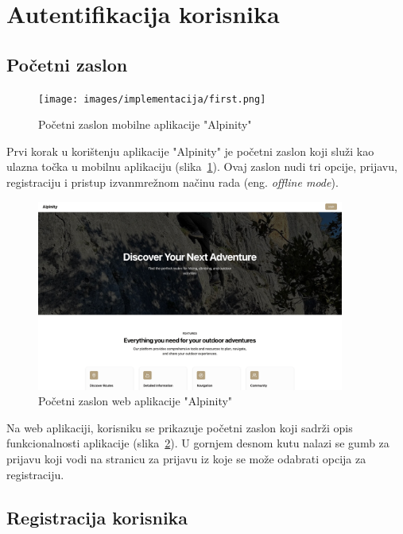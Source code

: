 \section{Autentifikacija korisnika}

\subsection{Početni zaslon}

\begin{figure}[H]
  \centering
  \texttt{[image: images/implementacija/first.png]}
  \caption{Početni zaslon mobilne aplikacije "Alpinity"}
  \label{fig:prvi_zaslon}
\end{figure}

Prvi korak u korištenju aplikacije "Alpinity" je početni zaslon koji služi kao ulazna točka u mobilnu aplikaciju (slika~\ref{fig:prvi_zaslon}). Ovaj zaslon nudi tri opcije, prijavu, registraciju i pristup izvanmrežnom načinu rada (eng. \textit{offline mode}).

\begin{figure}[H]
  \centering
  \includegraphics[width=0.9\textwidth]{images/implementacija/web/pocetni_zaslon.jpeg}
  \caption{Početni zaslon web aplikacije "Alpinity"}
  \label{fig:prvi_zaslon_web}
\end{figure}

Na web aplikaciji, korisniku se prikazuje početni zaslon koji sadrži opis funkcionalnosti aplikacije (slika~\ref{fig:prvi_zaslon_web}). U gornjem desnom kutu nalazi se gumb za prijavu koji vodi na stranicu za prijavu iz koje se može odabrati opcija za registraciju.

\subsection{Registracija korisnika}

